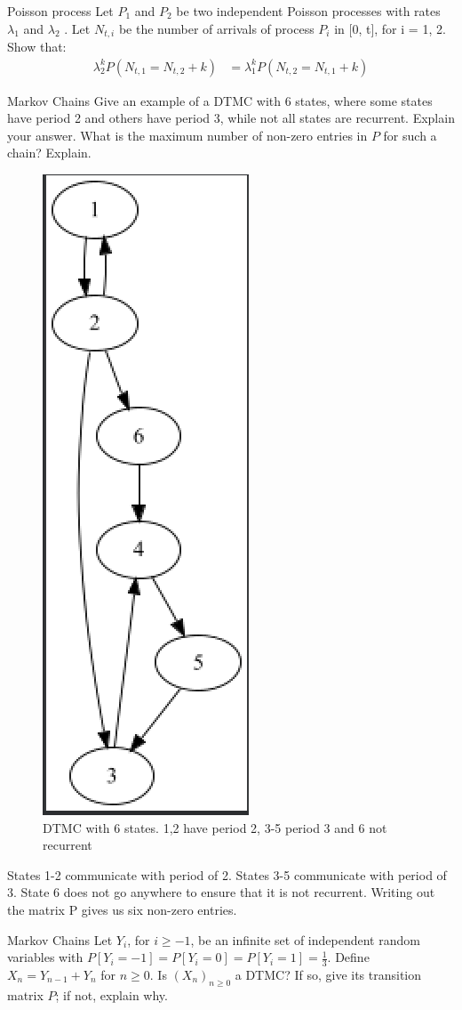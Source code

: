 \begin{problem}{Poisson process}
Let $P_1$ and $P_2$ be two independent Poisson processes with rates 
$\lambda_1$ and $\lambda_2$ . Let $N_{t,i}$ be the number of arrivals of process $P_i$ in [0, t], for i = 1, 2. Show that:
\begin{align*}
    \lambda_2^k P(N_{t,1} = N_{t,2} + k) 
    &=\lambda_1^k P(N _{t,2} = N_{t,1} + k)
\end{align*}
\end{problem}

\begin{problem}{Markov Chains}
Give an example of a DTMC with 6 states, where some states have period 2 and others have period 3, while not all states are recurrent. Explain your answer. What is the maximum number of non-zero entries in \( P \) for such a chain? Explain.
\end{problem}
\begin{solution}
    \begin{figure}[h!]
        \begin{center}
            \includegraphics[height=0.5\textwidth]{img/21.2.png}
        \end{center}
        \caption{DTMC with 6 states. 1,2 have period 2, 3-5 period 3 and 6 not recurrent}
    \end{figure}
\end{solution}
States 1-2 communicate with period of 2. States 3-5 communicate with period of 3. State 6 does not go anywhere to ensure that it is not recurrent. Writing out the matrix P gives us six non-zero entries.\\
\begin{problem}{Markov Chains}
Let \( Y_i \), for \( i \geq -1 \), be an infinite set of independent random variables with \( P [Y_i = -1] = P [Y_i = 0] = P [Y_i = 1] = \frac{1}{3} \). Define \( X_n = Y_{n-1} + Y_n \) for \( n \geq 0 \). Is \( (X_n)_{n \geq 0} \) a DTMC? If so, give its transition matrix \( P \); if not, explain why.
\end{problem}

